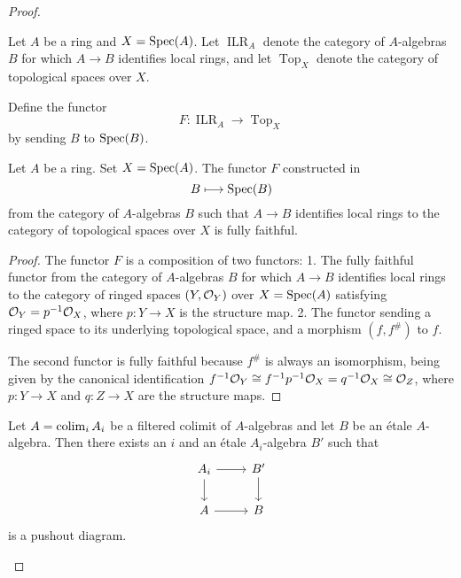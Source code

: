 \begin{proof}
\begin{definition}{\cite[\href{https://stacks.math.columbia.edu/tag/096L}{Tag 096L}]{stacks-project}}
  \label{def:identifies-local-ring-to-top}
  Let $A$ be a ring and $X = \operatorname{Spec}(A)$. Let $\operatorname{ILR}_A$ denote the category of $A$-algebras $B$ for which $A \to B$ identifies local rings, and let $\operatorname{Top}_X$ denote the category of topological spaces over $X$.
  
  Define the functor
  \[
  F \colon \operatorname{ILR}_A \longrightarrow \operatorname{Top}_X
  \]
  by sending $B$ to $\operatorname{Spec}(B)$.
\end{definition}

\begin{lemma}{\cite[\href{https://stacks.math.columbia.edu/tag/096L}{Tag 096L}]{stacks-project}}
  \label{thm:identifies-local-ring-to-top-fully-faithful}
  Let $A$ be a ring. Set $X = \operatorname{Spec} (A)$. The functor \(F\) constructed in 
  \[
  B \longmapsto \operatorname{Spec} (B)
  \]
  from the category of $A$-algebras $B$ such that $A \to B$ identifies local rings to the category of topological spaces over $X$ is fully faithful.
\end{lemma}

\begin{proof}
The functor \(F\) is a composition of two functors:
1. The fully faithful functor from the category of \(A\)-algebras \(B\) for which \(A \to B\) identifies local rings to the category of ringed spaces \((Y, {\mathcal{O}}_Y)\) over \(X = \operatorname{Spec}(A)\) satisfying \({\mathcal{O}}_Y = p^{-1}{\mathcal{O}}_X\), where \(p: Y \to X\) is the structure map.
2. The functor sending a ringed space to its underlying topological space, and a morphism \((f, f^\#)\) to \(f\).

The second functor is fully faithful because \(f^\#\) is always an isomorphism, being given by the canonical identification \(f^{-1}{\mathcal{O}}_Y \cong f^{-1}p^{-1}{\mathcal{O}}_X = q^{-1}{\mathcal{O}}_X \cong {\mathcal{O}}_Z\), where \(p: Y \to X\) and \(q: Z \to X\) are the structure maps.
\end{proof}

\begin{lemma}
    Let $A = \operatorname{colim}_i A_i$ be a filtered colimit of $A$-algebras and let $B$ be an étale $A$-algebra. Then
    there exists an $i$ and an étale $A_i$-algebra $B'$ such that
    \[
    \begin{tikzcd}
        A_i \arrow{r} \arrow{d} & B' \arrow{d} \\
        A \arrow{r} & B
    \end{tikzcd}
    \] is a pushout diagram.
    \label{lemma:etale-ind-spreads}
\end{lemma}


\end{proof}
